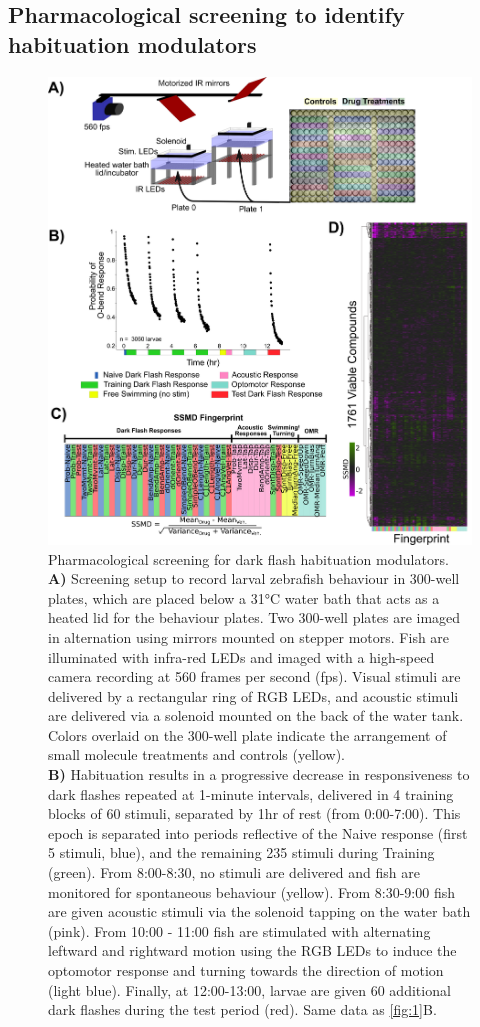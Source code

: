 \documentclass[9pt,lineno]{RandlettLab_elife}
\begin{document}
\subsection{Pharmacological screening to identify habituation modulators}
\vspace{3mm}

\begin{figure}
\begin{fullwidth}
\begin{center}

\includegraphics[width=0.77\linewidth]{Figure3 - ScreenSetup.png}
\caption{Pharmacological screening for dark flash habituation modulators. 
\\ \textbf{A)} Screening setup to record larval zebrafish behaviour in 300-well plates, which are placed below a 31°C water bath that acts as a heated lid for the behaviour plates. Two 300-well plates are imaged in alternation using mirrors mounted on stepper motors. Fish are illuminated with infra-red LEDs and imaged with a high-speed camera recording at 560 frames per second (fps). Visual stimuli are delivered by a rectangular ring of RGB LEDs, and acoustic stimuli are delivered via a solenoid mounted on the back of the water tank. Colors overlaid on the 300-well plate indicate the arrangement of small molecule treatments and controls (yellow). 
\\ \textbf{B)} Habituation results in a progressive decrease in responsiveness to dark flashes repeated at 1-minute intervals, delivered in 4 training blocks of 60 stimuli, separated by 1hr of rest (from 0:00-7:00). This epoch is separated into periods reflective of the Naive response (first 5 stimuli, blue), and the remaining 235 stimuli during Training (green). From 8:00-8:30, no stimuli are delivered and fish are monitored for spontaneous behaviour (yellow). From 8:30-9:00 fish are given acoustic stimuli via the solenoid tapping on the water bath (pink). From 10:00 - 11:00 fish are stimulated with alternating leftward and rightward motion using the RGB LEDs to induce the optomotor response and turning towards the direction of motion (light blue). Finally, at 12:00-13:00, larvae are given 60 additional dark flashes during the test period (red). Same data as \autoref{fig:1}B.
}
\end{center}
\end{fullwidth}
\end{figure}
\end{document}
